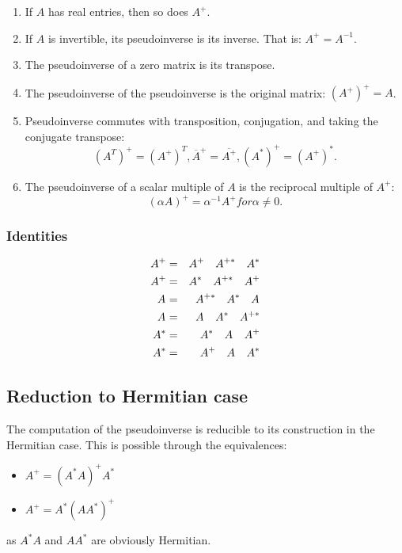 \begin{enumerate}[$\bullet$]
    \item If $A$ has real entries, then so does $A^+$.
    \item If $A$ is invertible, its pseudoinverse is its inverse. That is: $A^+ = A^{-1}$.
    \item The pseudoinverse of a zero matrix is its transpose.
    \item The pseudoinverse of the pseudoinverse is the original matrix: $(A^+)^+ = A$.
    \item Pseudoinverse commutes with transposition, conjugation, and taking the conjugate transpose:
        \begin{equation}
            (A^T)^+ = (A^+)^T, \overline{A}^+ = \overline{A^+}, (A^*)^+ = (A^+)^*.
            \label{eq0.2.3}
        \end{equation}
    \item The pseudoinverse of a scalar multiple of $A$ is the reciprocal multiple of $A^+$:
        \begin{equation}
            (\alpha A)^+ = \alpha^{-1} A^+ for \alpha \neq 0.
            \label{eq0.2.4}
        \end{equation}
\end{enumerate}

\subsubsection{Identities}
\begin{eqnarray}
    A^{+} &=& A^{+} \quad A^{+*} \quad A^{*} \notag \\
    A^{+} &=& A^{*} \quad A^{+*} \quad A^{+} \notag\\
    A^{} &=& A^{+*} \quad A^{*} \quad A^{} \notag\\
    A^{} &=& A^{} \quad A^{*} \quad A^{+*} \notag\\
    A^{*} &=& A^{*} \quad A^{} \quad A^{+} \notag\\
    A^{*} &=& A^{+} \quad A^{} \quad A^{*} 
    \label{eq0.2.5}
\end{eqnarray}


\subsection{Reduction to Hermitian case}
The computation of the pseudoinverse is reducible to its construction in the Hermitian case. This is possible through the equivalences:
\begin{itemize}
    \item $A^+ = (A^*A)^+A^*$
    \item $A^+ = A^*(AA^*)^+$
\end{itemize}
as $A^*A$ and $AA^*$ are obviously Hermitian.

